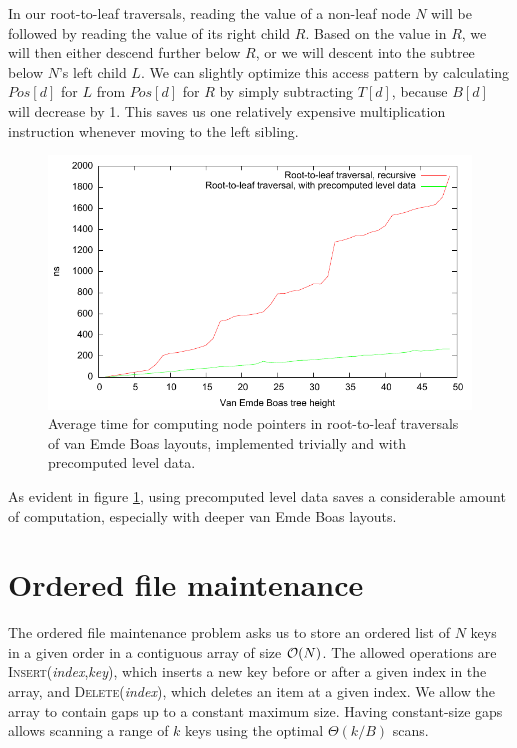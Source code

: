In our root-to-leaf traversals, reading the value of a non-leaf node $N$ will be
followed by reading the value of its right child $R$. Based on the value in
$R$, we will then either descend further below $R$, or we will descent into
the subtree below $N$'s left child $L$.
We can slightly optimize this access pattern by calculating $Pos[d]$ for $L$
from $Pos[d]$ for $R$ by simply subtracting $T[d]$, because $B[d]$ will
decrease by 1. This saves us one relatively expensive multiplication
instruction whenever moving to the left sibling.

\begin{figure}
\centering
\includegraphics{img/veb-drilldown-speed}
\caption{Average time for computing node pointers in root-to-leaf traversals
	of van Emde Boas layouts, implemented trivially and with precomputed
	level data.
}
\label{fig:veb_drilldown_speed}
\end{figure}
As evident in figure \ref{fig:veb_drilldown_speed}, using precomputed level data
saves a considerable amount of computation, especially with deeper van Emde Boas
layouts.

\section{Ordered file maintenance}
The ordered file maintenance problem asks us to store an ordered list of
$N$ keys in a given order in a contiguous array of size $\mathcal{O}(N)$.
The allowed operations are \textsc{Insert}(\emph{index},\emph{key}),
which inserts a new key before or after a given index in the array,
and \textsc{Delete}(\emph{index}), which deletes an item at a given index.
We allow the array to contain gaps up to a constant maximum size.
Having constant-size gaps allows scanning a range of $k$ keys using the
optimal $\Theta(k/B)$ scans.


